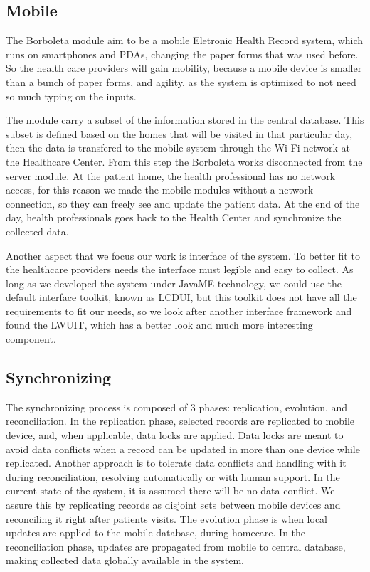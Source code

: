 \documentclass[12pt]{article}
\begin{document}
\subsection{Mobile}
The Borboleta module \cite{correia08} aim to be a mobile Eletronic Health Record system, which runs on smartphones and PDAs, changing the paper forms that was used before. So the health care providers will gain mobility, because a mobile device is smaller than a bunch of paper forms, and agility, as the system is optimized to not need so much typing on the inputs.

The module carry a subset of the information stored in the central database. This subset is defined based on the homes that will be visited in that particular day, then the data is transfered to the mobile system through the Wi-Fi network at the Healthcare Center. From this step the Borboleta works disconnected from the server module. At the patient home, the health professional has no network access, for this reason we made the mobile modules without a network connection, so they can freely see and update the patient data. At the end of the day, health professionals goes back to the Health Center and synchronize the collected data.

Another aspect that we focus our work is interface of the system. To better fit to the healthcare providers needs the interface must legible and easy to collect. As long as we developed the system under JavaME technology, we could use the default interface toolkit, known as LCDUI, but this toolkit does not have all the requirements to fit our needs, so we look after another interface framework and found the LWUIT, which has a better look and much more interesting component.

\subsection{Synchronizing}

The synchronizing process is composed of 3 phases: replication, evolution, and reconciliation. In the replication phase, selected records are replicated to mobile device, and, when applicable, data locks are applied. Data locks are meant to avoid data conflicts when a record can be updated in more than one device while replicated. Another approach is to tolerate data conflicts and handling with it during reconciliation, resolving automatically or with human support. In the current state of the system, it is assumed there will be no data conflict. We assure this by replicating records as disjoint sets between mobile devices and reconciling it right after patients visits. The evolution phase is when local updates are applied to the mobile database, during homecare. In the reconciliation phase, updates are propagated from mobile to central database, making collected data globally available in the system. 
\end{document}
